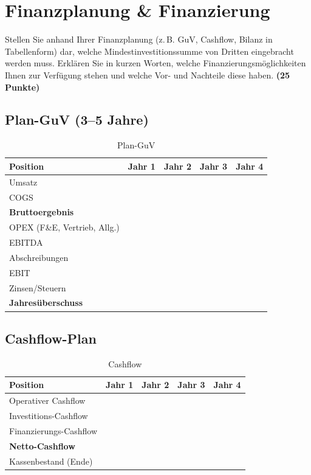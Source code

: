 \documentclass[
%
ngerman %
%
numeric %
]{wbh-assignment}
\begin{document}
\section{Finanzplanung \& Finanzierung}
\label{sec:finanzplanung}

\begin{aufgabenstellung}
Stellen Sie anhand Ihrer Finanzplanung (z.\,B. GuV, Cashflow, Bilanz in Tabellenform) dar, welche Mindestinvestitionssumme von Dritten eingebracht werden muss. Erklären Sie in kurzen Worten, welche Finanzierungsmöglichkeiten Ihnen zur Verfügung stehen und welche Vor- und Nachteile diese haben. \textbf{(25 Punkte)}
\end{aufgabenstellung}

\vspace*{5mm}

\subsection{Plan-GuV (3--5 Jahre)}
\begin{table}[htb!]
\centering
\caption{Plan-GuV}
\begin{tabular}{l r r r r}
\textbf{Position} & \textbf{Jahr 1} & \textbf{Jahr 2} & \textbf{Jahr 3} & \textbf{Jahr 4} \\
\hline
Umsatz & & & & \\
COGS & & & & \\
\textbf{Bruttoergebnis} & & & & \\
OPEX (F\&E, Vertrieb, Allg.) & & & & \\
EBITDA & & & & \\
Abschreibungen & & & & \\
EBIT & & & & \\
Zinsen/Steuern & & & & \\
\textbf{Jahresüberschuss} & & & & \\
\end{tabular}
\end{table}

\subsection{Cashflow-Plan}
\begin{table}[htb!]
\centering
\caption{Cashflow}
\begin{tabular}{l r r r r}
\textbf{Position} & \textbf{Jahr 1} & \textbf{Jahr 2} & \textbf{Jahr 3} & \textbf{Jahr 4} \\
\hline
Operativer Cashflow & & & & \\
Investitions-Cashflow & & & & \\
Finanzierungs-Cashflow & & & & \\
\textbf{Netto-Cashflow} & & & & \\
Kassenbestand (Ende) & & & & \\
\end{tabular}
\end{table}
\end{document}
